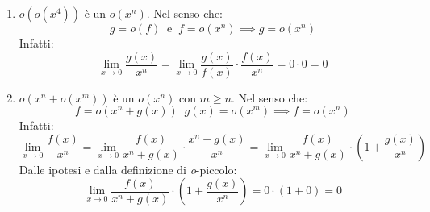 \begin{enumerate}
	\item $o(o(x^4))$ è un $o(x^n)$. Nel senso che:
		\begin{equation*}
			g = o(f) \;\; \text{e} \;\; f = o(x^n) \implies g = o(x^n)
		\end{equation*}
		Infatti:
		\begin{equation*}
			\lim_{x \to 0} \dfrac{g(x)}{x^n} = \lim_{x \to 0} \dfrac{g(x)}
            {f(x)} \cdot \dfrac{f(x)}{x^n} = 0 \cdot 0 = 0
		\end{equation*}

	\item $o(x^n + o(x^m))$ è un $o(x^n)$ con $m \geq n$. Nel senso che:
		\begin{equation*}
			f = o(x^n + g(x)) \;\; g(x) = o(x^m) \implies f = o(x^n)
		\end{equation*}
		Infatti:
		\begin{equation*}
			\lim_{x \to 0} \dfrac{f(x)}{x^n} = \lim_{x \to 0} \dfrac{f(x)}{x^n 
            + g(x)} \cdot \dfrac{x^n + g(x)}{x^n} = \lim_{x \to 0} \dfrac{f(x)}
            {x^n + g(x)} \cdot \left(1 + \dfrac{g(x)}{x^n}\right)
		\end{equation*}
		Dalle ipotesi e dalla definizione di \textit{o}-piccolo:
		\begin{equation*}
			\lim_{x \to 0} \dfrac{f(x)}{x^n + g(x)} \cdot \left(1 + 
            \dfrac{g(x)}{x^n}\right) = 0 \cdot (1 + 0) = 0
		\end{equation*}


\end{enumerate}
